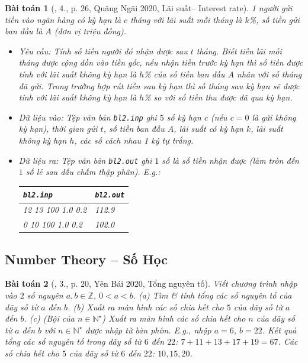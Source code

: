 \documentclass{article}
\newtheorem{baitoan}{Bài toán}
\begin{document}
\begin{baitoan}[\cite{VietSTEM2021}, 4., p. 26, Quãng Ngãi 2020, Lãi suất-- Interest rate]
	1 người gửi tiền vào ngân hàng có kỳ hạn là $c$ tháng với lãi suất mỗi tháng là $k$\emph{\%}, số tiền gửi ban đầu là $A$ (đơn vị triệu đồng). 
	\begin{itemize}
		\item {\sf Yêu cầu:} Tính số tiền người đó nhận được sau $t$ tháng. Biết tiền lãi mỗi tháng được cộng dồn vào tiền gốc, nếu nhận tiền trước kỳ hạn thì số tiền được tính với lãi suất không kỳ hạn là $h$\emph{\%} của số tiền ban đầu $A$ nhân với số tháng đã gửi. Trong trường hợp rút tiền sau kỳ hạn thì số tháng sau kỳ hạn sẽ được tính với lãi suất không kỳ hạn là $h$\emph{\%} so với số tiền thu được đã qua kỳ hạn.
		\item {\sf Dữ liệu vào:} Tệp văn bản \verb|bl2.inp| ghi $5$ số kỳ hạn $c$ (nếu $c = 0$ là gửi không kỳ hạn), thời gian gửi $t$, số tiền ban đầu $A$, lãi suất có kỳ hạn $k$, lãi suất không kỳ hạn $h$, các số cách nhau 1 ký tự trắng.
		\item {\sf Dữ liệu ra:} Tệp văn bản \verb|bl2.out| ghi $1$ số là số tiền nhận được (làm tròn đến $1$ số lẻ sau dấu chấm thập phân). E.g.:
		\begin{table}[H]
			\centering
			\begin{tabular}{|l|l|}
				\hline
				\texttt{bl2.inp} & \texttt{bl2.out} \\
				\hline
				12 13 100 1.0 0.2 & 112.9 \\
				\hline
				0 10 100 1.0 0.2 & 102.0 \\
				\hline
			\end{tabular}
		\end{table}
	\end{itemize}
\end{baitoan}


\subsection{Number Theory -- Số Học}

\begin{baitoan}[\cite{VietSTEM2021}, 3., p. 20, Yên Bái 2020, Tổng nguyên tố]
	Viết chương trình nhập vào $2$ số nguyên $a,b\in\mathbb{Z}$, $0 < a < b$. (a) Tìm \& tính tổng các số nguyên tố của dãy số từ $a$ đến $b$. (b) Xuất ra màn hình các số chia hết cho $5$ của dãy số từ $a$ đến $b$. (c) \emph{(Bội của $n\in\mathbb{N}^\star$)} Xuất ra màn hình các số chia hết cho $n$ của dãy số từ $a$ đến $b$ với $n\in\mathbb{N}^\star$ được nhập từ bàn phím. E.g., nhập $a = 6$, $b = 22$. Kết quả tổng các số nguyên tố trong dãy số từ $6$ đến $22$: $7 + 11 + 13 + 17 + 19 = 67$. Các số chia hết cho $5$ của dãy số từ $6$ đến $22$: $10,15,20$.
\end{baitoan}
\end{document}
